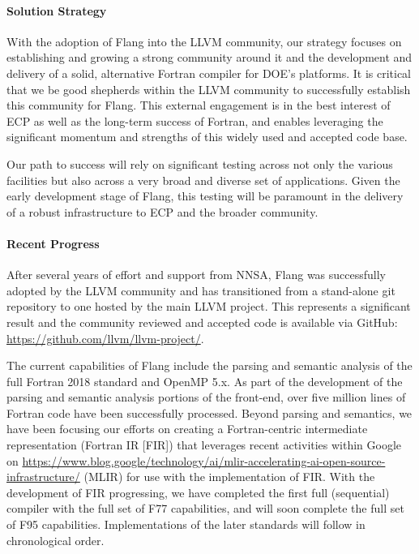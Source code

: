 \paragraph{Solution Strategy}

With the adoption of Flang into the LLVM community, our strategy
focuses on establishing and growing a strong community around it and the development
and delivery of a solid, alternative Fortran compiler for DOE's
platforms.  It is critical that we be good shepherds within
the LLVM community to successfully establish this community for Flang.
This external engagement is in the best interest
of ECP as well as the long-term success of Fortran, and enables leveraging
the significant momentum and strengths of this widely used and accepted
code base. 

Our path to success will rely on significant testing across not only
the various facilities but also across a very broad and diverse set of
applications. Given the early development stage of Flang, this testing
will be paramount in the delivery of a robust infrastructure to ECP
and the broader community.

\paragraph{Recent Progress}

After several years of effort and support from NNSA, Flang was 
successfully adopted by the LLVM community and has transitioned 
from a stand-alone git repository to one hosted by the main LLVM project.  This 
represents a significant result and the community reviewed and accepted code is
available via GitHub:
%
%
\url{https://github.com/llvm/llvm-project/}.

The current capabilities of Flang include the parsing and semantic
analysis of the full Fortran 2018 standard and OpenMP 5.x. As part of the
development of the parsing and semantic analysis portions of the
front-end, over five million lines of Fortran code have been
successfully processed. Beyond parsing and semantics, we have been
focusing our efforts on creating a Fortran-centric intermediate
representation (Fortran IR [FIR]) that leverages recent activities
within Google on 
\href{Multi-Level Intermediate Representations} 
{https://www.blog.google/technology/ai/mlir-accelerating-ai-open-source-infrastructure/}
(MLIR) for use with the implementation of FIR.
With the development of FIR progressing, we have completed
the first full (sequential) compiler with the full set of F77 
capabilities, and will soon complete the full set of F95 capabilities.
Implementations of the later standards will follow in chronological order.

